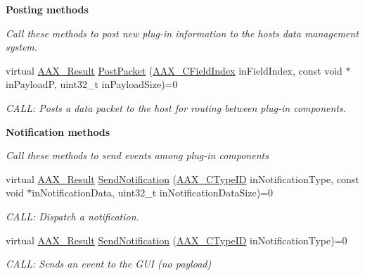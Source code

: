 \begin{Indent}{\bf Posting methods}\par
{\em Call these methods to post new plug-\/in information to the host\textquotesingle{}s data management system. }\begin{DoxyCompactItemize}
\item 
virtual \hyperlink{a00149_a4d8f69a697df7f70c3a8e9b8ee130d2f}{A\+A\+X\+\_\+\+Result} \hyperlink{a00090_ae5dd2b5925dbc181513bca1c4ac5e716}{Post\+Packet} (\hyperlink{a00149_ae807f8986143820cfb5d6da32165c9c7}{A\+A\+X\+\_\+\+C\+Field\+Index} in\+Field\+Index, const void $\ast$in\+Payload\+P, uint32\+\_\+t in\+Payload\+Size)=0
\begin{DoxyCompactList}\small\item\em C\+A\+L\+L\+: Posts a data packet to the host for routing between plug-\/in components. \end{DoxyCompactList}\end{DoxyCompactItemize}
\end{Indent}
\begin{Indent}{\bf Notification methods}\par
{\em Call these methods to send events among plug-\/in components }\begin{DoxyCompactItemize}
\item 
virtual \hyperlink{a00149_a4d8f69a697df7f70c3a8e9b8ee130d2f}{A\+A\+X\+\_\+\+Result} \hyperlink{a00090_a0384f820cecf8cf7671057060bf5ba4f}{Send\+Notification} (\hyperlink{a00149_ac678f9c1fbcc26315d209f71a147a175}{A\+A\+X\+\_\+\+C\+Type\+I\+D} in\+Notification\+Type, const void $\ast$in\+Notification\+Data, uint32\+\_\+t in\+Notification\+Data\+Size)=0
\begin{DoxyCompactList}\small\item\em C\+A\+L\+L\+: Dispatch a notification. \end{DoxyCompactList}\item 
virtual \hyperlink{a00149_a4d8f69a697df7f70c3a8e9b8ee130d2f}{A\+A\+X\+\_\+\+Result} \hyperlink{a00090_ad98d549cc7bec4039ce174438d46d5db}{Send\+Notification} (\hyperlink{a00149_ac678f9c1fbcc26315d209f71a147a175}{A\+A\+X\+\_\+\+C\+Type\+I\+D} in\+Notification\+Type)=0
\begin{DoxyCompactList}\small\item\em C\+A\+L\+L\+: Sends an event to the G\+U\+I (no payload) \end{DoxyCompactList}\end{DoxyCompactItemize}
\end{Indent}
